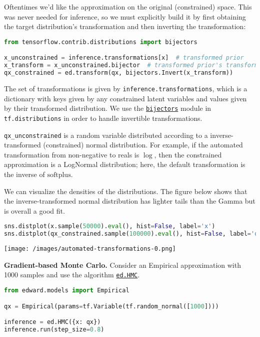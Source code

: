 Oftentimes we'd like the approximation on the original (constrained)
space. This was never needed for inference, so we must explicitly
build it by first obtaining the target distribution's transformation
and then inverting the transformation:

\begin{lstlisting}[language=Python]
from tensorflow.contrib.distributions import bijectors

x_unconstrained = inference.transformations[x]  # transformed prior
x_transform = x_unconstrained.bijector  # transformed prior's transformation
qx_constrained = ed.transform(qx, bijectors.Invert(x_transform))
\end{lstlisting}

The set of transformations is given by
\texttt{inference.transformations}, which is a dictionary with keys
given by any constrained latent variables and values given by their
transformed distribution. We use the
\href{https://www.tensorflow.org/versions/master/api_docs/python/tf/distributions/bijectors}{\texttt{bijectors}}
module in \texttt{tf.distributions} in order to handle invertible
transformations.

\texttt{qx_unconstrained} is a random variable distributed
according to a inverse-transformed (constrained) normal distribution.
For example, if the automated transformation from non-negative to
reals is $\log$, then the constrained approximation is a LogNormal
distribution; here, the default transformation is the inverse of
$\textrm{softplus}$.

We can visualize the densities of the distributions.
The figure below shows that the inverse-transformed normal
distribution has lighter tails than the Gamma but is overall a
good fit.

\begin{lstlisting}[language=Python]
sns.distplot(x.sample(50000).eval(), hist=False, label='x')
sns.distplot(qx_constrained.sample(100000).eval(), hist=False, label='qx')
\end{lstlisting}

\texttt{[image: /images/automated-transformations-0.png]}

\textbf{Gradient-based Monte Carlo.}
Consider an Empirical approximation with 1000 samples
and use the algorithm \href{/api/ed/HMC}{\texttt{ed.HMC}}.

\begin{lstlisting}[language=Python]
from edward.models import Empirical

qx = Empirical(params=tf.Variable(tf.random_normal([1000])))

inference = ed.HMC({x: qx})
inference.run(step_size=0.8)
\end{lstlisting}

